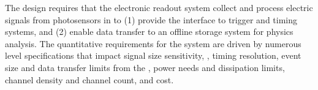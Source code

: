 


The  design requires that the electronic readout system collect and process electric signals from photosensors in \lar to (1) provide the interface to trigger and timing systems, %
and (2) enable data transfer to an offline storage system for physics analysis. The quantitative requirements for the system are driven by numerous  level specifications that impact signal size sensitivity, , timing resolution, event size and data transfer limits from the , power needs and dissipation limits, channel density and channel count, and cost. 



